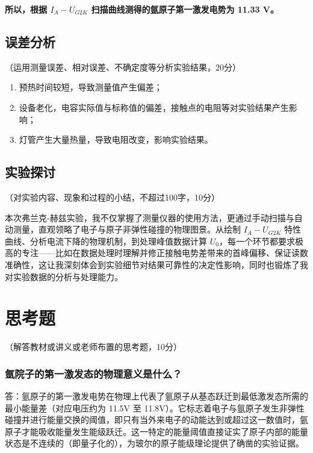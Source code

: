 \documentclass[10pt,a4paper]{ctexart}
\newcommand{\myspace}[1]{\par\vspace{#1\baselineskip}} %
\newcommand{\xiaosi}{\fontsize{12pt}{16pt}\selectfont}
\begin{document}
\textbf{所以，根据 $I_A - U_{G2K}$ 扫描曲线测得的氩原子第一激发电势为 11.33 V。}

    \subsection{误差分析}
    \xiaosi （运用测量误差、相对误差、不确定度等分析实验结果，20分）
    
    \begin{enumerate}
        \item 预热时间较短，导致测量值产生偏差；
        \item 设备老化，电容实际值与标称值的偏差，接触点的电阻等对实验结果产生影响；
        \item 灯管产生大量热量，导致电阻改变，影响实验结果。
    \end{enumerate}   
    
    \subsection{实验探讨}
    \xiaosi （对实验内容、现象和过程的小结，不超过100字，10分）

    \myspace{1}

    本次弗兰克-赫兹实验，我不仅掌握了测量仪器的使用方法，更通过手动扫描与自动测量，直观领略了电子与原子非弹性碰撞的物理图景。从绘制 $I_A-U_{G2K}$ 特性曲线、分析电流下降的物理机制，到处理峰值数据计算 $U_0$，每一个环节都要求极高的专注——比如在数据处理时理解并修正接触电势差带来的首峰偏移、保证读数准确性，这让我深刻体会到实验细节对结果可靠性的决定性影响，同时也锻炼了我对实验数据的分析与处理能力。
    
    \section{思考题}

    \xiaosi （解答教材或讲义或老师布置的思考题，10分）

    \subsubsection*{氩院子的第一激发态的物理意义是什么？}

    答：氩原子的第一激发电势在物理上代表了氩原子从基态跃迁到最低激发态所需的最小能量差（对应电压约为 11.5V 至 11.8V）。它标志着电子与氩原子发生非弹性碰撞并进行能量交换的阈值，即只有当外来电子的动能达到或超过这一数值时，氩原子才能吸收能量发生能级跃迁。这一特定的能量阈值直接证实了原子内部的能量状态是不连续的（即量子化的），为玻尔的原子能级理论提供了确凿的实验证据。
\end{document}
